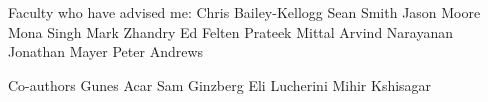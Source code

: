 Faculty who have advised me:
Chris Bailey-Kellogg
Sean Smith
Jason Moore
Mona Singh
Mark Zhandry
Ed Felten
Prateek Mittal
Arvind Narayanan
Jonathan Mayer
Peter Andrews


Co-authors
Gunes Acar
Sam Ginzberg
Eli Lucherini
Mihir Kshisagar